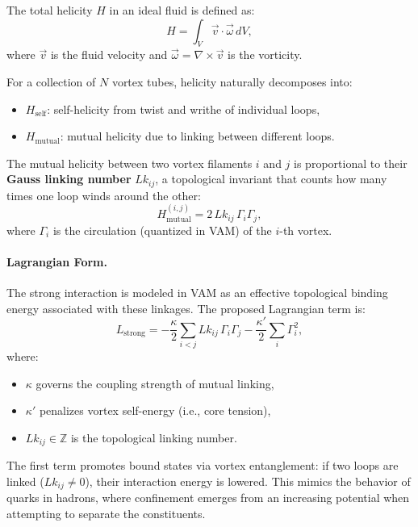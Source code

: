 The total helicity \( H \) in an ideal fluid is defined as:
\[
H = \int_V \vec{v} \cdot \vec{\omega} \, dV,
\]
where \( \vec{v} \) is the fluid velocity and \( \vec{\omega} = \nabla \times \vec{v} \) is the vorticity.

For a collection of \( N \) vortex tubes, helicity naturally decomposes into:
\begin{itemize}
    \item \( H_{\text{self}} \): self-helicity from twist and writhe of individual loops,
    \item \( H_{\text{mutual}} \): mutual helicity due to linking between different loops.
\end{itemize}

The mutual helicity between two vortex filaments \( i \) and \( j \) is proportional to their \textbf{Gauss linking number} \( Lk_{ij} \), a topological invariant that counts how many times one loop winds around the other:
\[
H_{\text{mutual}}^{(i,j)} = 2\, Lk_{ij} \, \Gamma_i \Gamma_j,
\]
where \( \Gamma_i \) is the circulation (quantized in VAM) of the \( i \)-th vortex.

\vspace{0.5em}
\paragraph{Lagrangian Form.} The strong interaction is modeled in VAM as an effective topological binding energy associated with these linkages. The proposed Lagrangian term is:
\begin{equation}
    L_{\text{strong}} = -\frac{\kappa}{2} \sum_{i<j} Lk_{ij} \, \Gamma_i \Gamma_j
    - \frac{\kappa'}{2} \sum_i \Gamma_i^2,
    \label{eq:strong-lagrangian}
\end{equation}
where:
\begin{itemize}
    \item \( \kappa \) governs the coupling strength of mutual linking,
    \item \( \kappa' \) penalizes vortex self-energy (i.e., core tension),
    \item \( Lk_{ij} \in \mathbb{Z} \) is the topological linking number.
\end{itemize}

The first term promotes bound states via vortex entanglement: if two loops are linked (\( Lk_{ij} \neq 0 \)), their interaction energy is lowered. This mimics the behavior of quarks in hadrons, where confinement emerges from an increasing potential when attempting to separate the constituents.

